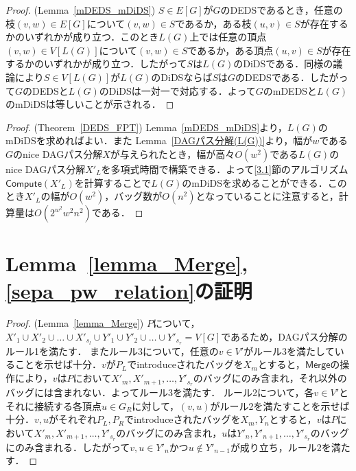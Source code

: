 \documentclass[master]{kuisthesis}		%
\theoremstyle{plain}
\theoremstyle{definition}
\begin{document}
{\begin{proof}(Lemma~\ref{mDEDS_mDiDS})
    $S\in E[G]$が$G$のDEDSであるとき，任意の枝$(v, w) \in E[G]$について$(v, w)\in S$であるか，ある枝$(u, v)\in S$が存在するかのいずれかが成り立つ．このとき$L(G)$上では任意の頂点$(v, w) \in V[L(G)]$について$(v, w)\in S$であるか，ある頂点$(u, v)\in S$が存在するかのいずれかが成り立つ．したがって$S$は$L(G)$のDiDSである．同様の議論により$S\in V[L(G)]$が$L(G)$のDiDSならば$S$は$G$のDEDSである．したがって$G$のDEDSと$L(G)$のDiDSは一対一で対応する．よって$G$のmDEDSと$L(G)$のmDiDSは等しいことが示される．
\end{proof}



\begin{proof}(Theorem~\ref{DEDS_FPT})
    Lemma~\ref{mDEDS_mDiDS}より，$L(G)$のmDiDSを求めればよい．また Lemma~\ref{DAGパス分解(L(G))}より，幅が$w$である$G$のnice DAGパス分解$X$が与えられたとき，幅が高々$O(w^2)$である$L(G)$のnice DAGパス分解$X'_L$を多項式時間で構築できる．よって\ref{3.1}節のアルゴリズム$\mathsf{Compute}(X'_L)$を計算することで$L(G)$のmDiDSを求めることができる．このとき$X'_L$の幅が$O(w^2)$，バッグ数が$O(n^2)$となっていることに注意すると，計算量は$O(2^{w^2}w^2n^2)$である．
\end{proof}














\section{Lemma~\ref{lemma_Merge}, \ref{sepa_pw_relation}の証明}

\begin{proof}(Lemma~\ref{lemma_Merge})
$P$について，$X'_1 \cup X'_2 \cup \dots \cup X'_{s_l} \cup Y'_1 \cup Y'_2 \cup \dots \cup Y'_{s_r} = V[G]$であるため，DAGパス分解のルール1を満たす．
またルール3について，任意の$v \in V'$がルール3を満たしていることを示せば十分．$v$が$P_L$でintroduceされたバッグを$X_m$とすると，$\mathsf{Merge}$の操作により，$v$は$P$において$X'_m, X'_{m+1}, \dots , Y'_{s_r}$のバッグにのみ含まれ，それ以外のバッグには含まれない．よってルール3を満たす．
ルール2について，各$v \in V'$とそれに接続する各頂点$u \in G_R$に対して，$(v, u)$がルール2を満たすことを示せば十分．$v, u$がそれぞれ$P_L, P_R$でintroduceされたバッグを$X_m, Y_n$とすると，$v$は$P$において$X'_m, X'_{m+1}, \dots , Y'_{s_r}$のバッグにのみ含まれ，$u$は$Y'_n, Y'_{n+1}, \dots , Y'_{s_r}$のバッグにのみ含まれる．したがって$v, u \in Y'_n$かつ$u \notin Y'_{n-1}$が成り立ち，ルール2を満たす．
\end{proof} 

}
\end{document}
